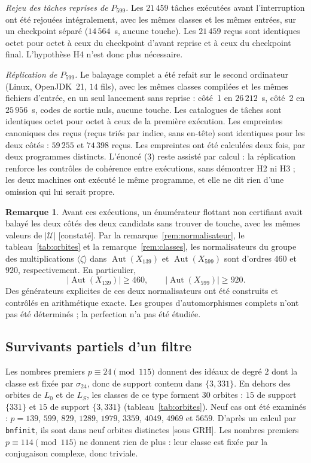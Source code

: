 \documentclass[11pt,a4paper]{amsart}
\theoremstyle{plain}
\theoremstyle{definition}
\newtheorem{remarque}[theoreme]{Remarque}
\numberwithin{equation}{section}
\newcommand{\Uc}{\mathcal{U}}
\DeclareMathOperator{\Aut}{Aut}
\newcommand{\Lz}{L_{0}}
\newcommand{\LS}{L_{S}}
\newcommand{\st}[1]{\textup{\textsf{\small[#1]}}}
\newcommand{\GRH}{\st{sous GRH}}
\newcommand{\CONS}{\st{constaté}}
\begin{document}
\emph{Rejeu des tâches reprises de $P_{599}$.} Les $21\,459$ tâches exécutées avant l'interruption ont été rejouées intégralement, avec les mêmes classes et les mêmes entrées, sur un checkpoint séparé ($14\,564$~s, aucune touche). Les $21\,459$ reçus sont identiques octet pour octet à ceux du checkpoint d'avant reprise et à ceux du checkpoint final. L'hypothèse H4 n'est donc plus nécessaire.

\emph{Réplication de $P_{599}$.} Le balayage complet a été refait sur le second ordinateur (Linux, OpenJDK~21, $14$ fils), avec les mêmes classes compilées et les mêmes fichiers d'entrée, en un seul lancement sans reprise : côté~1 en $26\,212$~s, côté~2 en $25\,956$~s, codes de sortie nuls, aucune touche. Les catalogues de tâches sont identiques octet pour octet à ceux de la première exécution. Les empreintes canoniques des reçus (reçus triés par indice, sans en-tête) sont identiques pour les deux côtés : $59\,255$ et $74\,398$ reçus. Les empreintes ont été calculées deux fois, par deux programmes distincts. L'énoncé (3) reste assisté par calcul : la réplication renforce les contrôles de cohérence entre exécutions, sans démontrer H2 ni H3 ; les deux machines ont exécuté le même programme, et elle ne dit rien d'une omission qui lui serait propre.

\begin{remarque}
Avant ces exécutions, un énumérateur flottant non certifiant avait balayé les deux côtés des deux candidats sans trouver de touche, avec les mêmes valeurs de $|\Uc|$ \CONS. Par la remarque~\ref{rem:normalisateur}, le tableau~\ref{tab:orbites}
et la remarque~\ref{rem:classes}, les normalisateurs du groupe des
multiplications $\langle\zeta\rangle$ dans $\Aut(X_{139})$ et
$\Aut(X_{599})$ sont d'ordres $460$ et $920$, respectivement.
En particulier,
\[
|\Aut(X_{139})|\ge460,\qquad |\Aut(X_{599})|\ge920.
\]
Des générateurs explicites de ces deux normalisateurs ont été construits
et contrôlés en arithmétique exacte. Les groupes d'automorphismes
complets n'ont pas été déterminés ; la perfection n'a pas été étudiée.
\end{remarque}

\subsection{Survivants partiels d'un filtre}\label{subsec:survivants}

Les nombres premiers $p\equiv24\pmod{115}$ donnent des idéaux de degré $2$ dont la classe est fixée par $\sigma_{24}$, donc de support contenu dans $\{3,331\}$. En dehors des orbites de $\Lz$ et de $\LS$, les classes de ce type forment $30$ orbites : $15$ de support $\{331\}$ et $15$ de support $\{3,331\}$ (tableau~\ref{tab:orbites}). Neuf cas ont été examinés : $p=139$, $599$, $829$, $1289$, $1979$, $3359$, $4049$, $4969$ et $5659$. D'après un calcul par \texttt{bnfinit}, ils sont dans neuf orbites distinctes \GRH. Les nombres premiers $p\equiv114\pmod{115}$ ne donnent rien de plus : leur classe est fixée par la conjugaison complexe, donc triviale.
\end{document}
